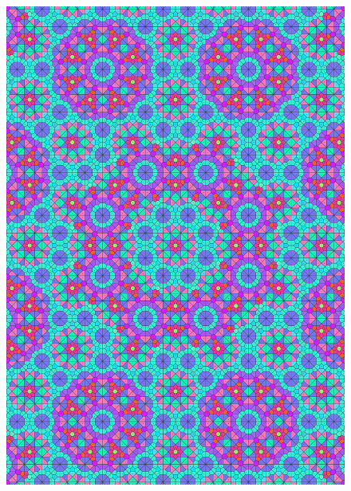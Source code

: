 \documentclass[text.tex]{subfiles}
\begin{document}
\begin{figure}[h!]
\centering
\includegraphics[width=1\textwidth]{img/results/octagon/quasi_polygon-octagon_112132_(-5_3alpha_2).pdf}
\end{figure}
\end{document}
